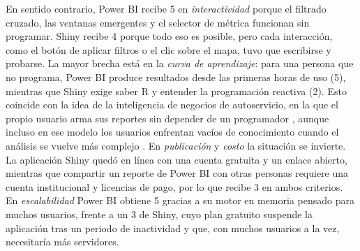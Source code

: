 \documentclass[12pt,a4paper]{article}
\begin{document}
En sentido contrario, Power BI recibe 5 en \emph{interactividad} porque el filtrado cruzado, las ventanas
emergentes y el selector de métrica funcionan sin programar. Shiny recibe 4 porque todo eso es posible,
pero cada interacción, como el botón de aplicar filtros o el clic sobre el mapa, tuvo que escribirse y
probarse. La mayor brecha está en la \emph{curva de aprendizaje}: para una persona que no programa, Power BI
produce resultados desde las primeras horas de uso (5), mientras que Shiny exige saber R y entender la programación
reactiva (2). Esto coincide con la idea de la inteligencia de negocios de autoservicio, en la que el
propio usuario arma sus reportes sin depender de un programador \citep{alpar2016}, aunque incluso en ese
modelo los usuarios enfrentan vacíos de conocimiento cuando el análisis se vuelve más complejo
\citep{lennerholt2021}. En \emph{publicación} y \emph{costo} la situación se invierte. La aplicación Shiny quedó en
línea con una cuenta gratuita y un enlace abierto, mientras que compartir un reporte de Power BI con otras
personas requiere una cuenta institucional y licencias de pago, por lo que recibe 3 en ambos criterios. En
\emph{escalabilidad} Power BI obtiene 5 gracias a su motor en memoria pensado para muchos usuarios, frente a
un 3 de Shiny, cuyo plan gratuito suspende la aplicación tras un periodo de inactividad y que, con muchos usuarios a
la vez, necesitaría más servidores.
\end{document}
